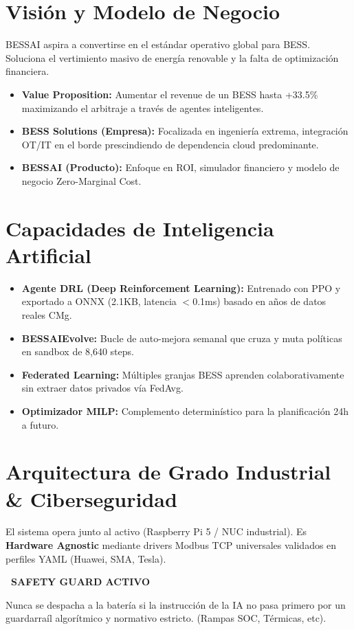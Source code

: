 \documentclass[11pt,a4paper]{article}
\begin{document}
\section{Visión y Modelo de Negocio}
BESSAI aspira a convertirse en el estándar operativo global para BESS. Soluciona el vertimiento masivo de energía renovable y la falta de optimización financiera.
\begin{itemize}
    \item \textbf{Value Proposition:} Aumentar el revenue de un BESS hasta +33.5\% maximizando el arbitraje a través de agentes inteligentes.
    \item \textbf{BESS Solutions (Empresa):} Focalizada en ingeniería extrema, integración OT/IT en el borde prescindiendo de dependencia cloud predominante.
    \item \textbf{BESSAI (Producto):} Enfoque en ROI, simulador financiero y modelo de negocio Zero-Marginal Cost.
\end{itemize}

\section{Capacidades de Inteligencia Artificial}
\begin{itemize}
    \item \textbf{Agente DRL (Deep Reinforcement Learning):} Entrenado con PPO y exportado a ONNX (2.1KB, latencia $<$0.1ms) basado en años de datos reales CMg.
    \item \textbf{BESSAIEvolve:} Bucle de auto-mejora semanal que cruza y muta políticas en sandbox de 8,640 steps.
    \item \textbf{Federated Learning:} Múltiples granjas BESS aprenden colaborativamente sin extraer datos privados vía FedAvg.
    \item \textbf{Optimizador MILP:} Complemento determinístico para la planificación 24h a futuro.
\end{itemize}

\section{Arquitectura de Grado Industrial \& Ciberseguridad}
El sistema opera junto al activo (Raspberry Pi 5 / NUC industrial). Es \textbf{Hardware Agnostic} mediante drivers Modbus TCP universales validados en perfiles YAML (Huawei, SMA, Tesla).

\begin{tcolorbox}[colback=bgcard,colframe=accentorange,arc=2mm,boxrule=1mm,leftrule=3mm]
{\bfseries\color{accentorange} \textbullet\ SAFETY GUARD ACTIVO}\par
Nunca se despacha a la batería si la instrucción de la IA no pasa primero por un guardarraíl algorítmico y normativo estricto. (Rampas SOC, Térmicas, etc).
\end{tcolorbox}
\end{document}
